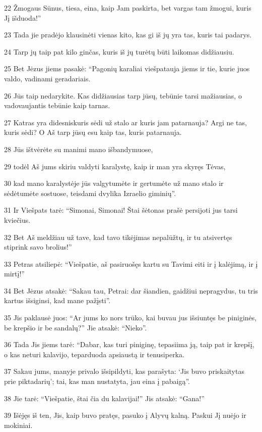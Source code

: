 \par 22 Žmogaus Sūnus, tiesa, eina, kaip Jam paskirta, bet vargas tam žmogui, kuris Jį išduoda!” 
\par 23 Tada jie pradėjo klausinėti vienas kito, kas gi iš jų yra tas, kuris tai padarys. 
\par 24 Tarp jų taip pat kilo ginčas, kuris iš jų turėtų būti laikomas didžiausiu. 
\par 25 Bet Jėzus jiems pasakė: “Pagonių karaliai viešpatauja jiems ir tie, kurie juos valdo, vadinami geradariais. 
\par 26 Jūs taip nedarykite. Kas didžiausias tarp jūsų, tebūnie tarsi mažiausias, o vadovaujantis tebūnie kaip tarnas. 
\par 27 Katras yra didesnis­kuris sėdi už stalo ar kuris jam patarnauja? Argi ne tas, kuris sėdi? O Aš tarp jūsų esu kaip tas, kuris patarnauja. 
\par 28 Jūs ištvėrėte su manimi mano išbandymuose, 
\par 29 todėl Aš jums skiriu valdyti karalystę, kaip ir man yra skyręs Tėvas, 
\par 30 kad mano karalystėje jūs valgytumėte ir gertumėte už mano stalo ir sėdėtumėte sostuose, teisdami dvylika Izraelio giminių”. 
\par 31 Ir Viešpats tarė: “Simonai, Simonai! Štai šėtonas prašė persijoti jus tarsi kviečius. 
\par 32 Bet Aš meldžiau už tave, kad tavo tikėjimas nepalūžtų, ir tu atsivertęs stiprink savo brolius!” 
\par 33 Petras atsiliepė: “Viešpatie, aš pasiruošęs kartu su Tavimi eiti ir į kalėjimą, ir į mirtį!” 
\par 34 Bet Jėzus atsakė: “Sakau tau, Petrai: dar šiandien, gaidžiui nepragydus, tu tris kartus išsiginsi, kad mane pažįsti”. 
\par 35 Jis paklausė juos: “Ar jums ko nors trūko, kai buvau jus išsiuntęs be piniginės, be krepšio ir be sandalų?” Jie atsakė: “Nieko”. 
\par 36 Tada Jis jiems tarė: “Dabar, kas turi piniginę, tepasiima ją, taip pat ir krepšį, o kas neturi kalavijo, teparduoda apsiaustą ir tenusiperka. 
\par 37 Sakau jums, manyje privalo išsipildyti, kas parašyta: ‘Jis buvo priskaitytas prie piktadarių’; tai, kas man nustatyta, jau eina į pabaigą”. 
\par 38 Jie tarė: “Viešpatie, štai čia du kalavijai!” Jis atsakė: “Gana!” 
\par 39 Išėjęs iš ten, Jis, kaip buvo pratęs, pasuko į Alyvų kalną. Paskui Jį nuėjo ir mokiniai. 
